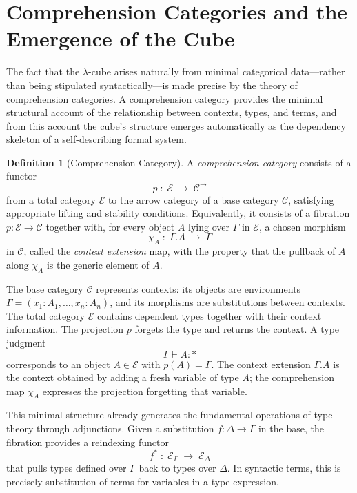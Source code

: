 \documentclass[12pt,a4paper]{article}
\theoremstyle{plain}
\theoremstyle{definition}
\newtheorem{definition}[theorem]{Definition}
\newcommand{\E}{\mathcal{E}}
\newcommand{\C}{\mathcal{C}}
\begin{document}
\section{Comprehension Categories and the Emergence of the Cube}

The fact that the $\lambda$-cube arises naturally from minimal categorical data---rather than being stipulated syntactically---is made precise by the theory of comprehension categories. A comprehension category provides the minimal structural account of the relationship between contexts, types, and terms, and from this account the cube's structure emerges automatically as the dependency skeleton of a self-describing formal system.

\begin{definition}[Comprehension Category]
A \emph{comprehension category} consists of a functor
\[
p \;:\; \E \;\longrightarrow\; \C^\to
\]
from a total category $\E$ to the arrow category of a base category $\C$, satisfying appropriate lifting and stability conditions. Equivalently, it consists of a fibration $p : \E \to \C$ together with, for every object $A$ lying over $\Gamma$ in $\E$, a chosen morphism
\[
\chi_A \;:\; \Gamma.A \;\longrightarrow\; \Gamma
\]
in $\C$, called the \emph{context extension} map, with the property that the pullback of $A$ along $\chi_A$ is the generic element of $A$.
\end{definition}

The base category $\C$ represents contexts: its objects are environments $\Gamma = (x_1 : A_1, \dots, x_n : A_n)$, and its morphisms are substitutions between contexts. The total category $\E$ contains dependent types together with their context information. The projection $p$ forgets the type and returns the context. A type judgment
\[
\Gamma \vdash A : *
\]
corresponds to an object $A \in \E$ with $p(A) = \Gamma$. The context extension $\Gamma.A$ is the context obtained by adding a fresh variable of type $A$; the comprehension map $\chi_A$ expresses the projection forgetting that variable.

This minimal structure already generates the fundamental operations of type theory through adjunctions. Given a substitution $f : \Delta \to \Gamma$ in the base, the fibration provides a reindexing functor
\[
f^* \;:\; \E_\Gamma \;\longrightarrow\; \E_\Delta
\]
that pulls types defined over $\Gamma$ back to types over $\Delta$. In syntactic terms, this is precisely substitution of terms for variables in a type expression.
\end{document}

